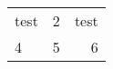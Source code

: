 \documentclass{article}
\begin{document}
\begin{tabular}{ l | c | r }
test & 2 & test \\
4 & 5 & 6 \\
\end{tabular}
\end{document}
